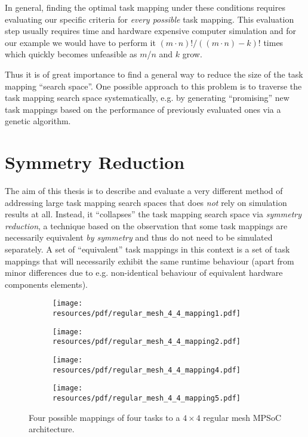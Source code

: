 In general, finding the optimal task mapping under these conditions requires
evaluating our specific criteria for \textit{every possible} task mapping. This
evaluation step usually requires time and hardware expensive computer
simulation and for our example we would have to perform it $(m \cdot n)! / ((m
\cdot n) - k)!$ times which quickly becomes unfeasible as $m$/$n$ and $k$ grow.

Thus it is of great importance to find a general way to reduce the size of the
task mapping ``search space''. One possible approach to this problem is to
traverse the task mapping search space systematically, e.g. by generating
``promising'' new task mappings based on the performance of previously
evaluated ones via a genetic algorithm.

\section{Symmetry Reduction}
\label{sec:mot_symmetry_reduction}

The aim of this thesis is to describe and evaluate a very different method of
addressing large task mapping search spaces that does \textit{not} rely on
simulation results at all. Instead, it ``collapses'' the task mapping search
space via \textit{symmetry reduction}, a technique based on the observation
that some task mappings are necessarily equivalent \textit{by symmetry} and
thus do not need to be simulated separately. A set of ``equivalent'' task
mappings in this context is a set of task mappings that will necessarily
exhibit the same runtime behaviour (apart from minor differences due to e.g.
non-identical behaviour of equivalent hardware components elements).

\begin{figure}
  \centering
  \begin{subfigure}{.4\textwidth}
    \texttt{[image: resources/pdf/regular\_mesh\_4\_4\_mapping1.pdf]}
    \caption{}
  \end{subfigure}
  \hspace*{\fill}
  \begin{subfigure}{.4\textwidth}
    \texttt{[image: resources/pdf/regular\_mesh\_4\_4\_mapping2.pdf]}
    \caption{}
  \end{subfigure}
  \begin{subfigure}{.4\textwidth}
    \texttt{[image: resources/pdf/regular\_mesh\_4\_4\_mapping4.pdf]}
    \caption{}
  \end{subfigure}
  \hspace*{\fill}
  \begin{subfigure}{.4\textwidth}
    \texttt{[image: resources/pdf/regular\_mesh\_4\_4\_mapping5.pdf]}
    \caption{}
  \end{subfigure}
  \caption{Four possible mappings of four tasks to a $4 \times 4$ regular mesh
           MPSoC architecture.}
  \label{fig:regular_mesh_4_4_mappings}
\end{figure}

